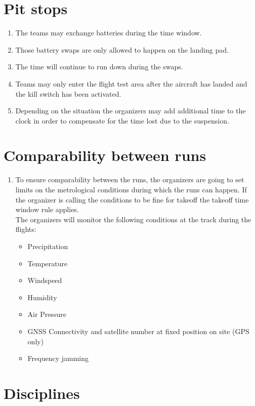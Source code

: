     \section{Pit stops}
    \begin{enumerate}
      \item The teams may exchange batteries during the time window. 
      \item Those battery swaps are only allowed to happen on the landing pad. 
      \item The time will continue to run down during the swaps. 
      \item Teams may only enter the flight test area after the aircraft has landed and the kill switch has been activated.  
      \item Depending on the situation the organizers may add additional time to the clock in order to compensate for the time lost due to the suspension. 
    \end{enumerate}

    \section{Comparability between runs}
    \begin{enumerate}
      \item To ensure comparability between the runs, the organizers are going to set limits on the metrological conditions during which the runs can happen. If the organizer is calling the conditions to be fine for takeoff the takeoff time window rule applies. \\
      The organizers will monitor the following conditions at the track during the flights:
      \begin{itemize}
        \item Precipitation
        \item Temperature 
        \item Windspeed
        \item Humidity
        \item Air Pressure
        \item GNSS Connectivity and satellite number at fixed position on site (GPS only) 
        \item Frequency jamming
      \end{itemize}

    \end{enumerate}

    \section{Disciplines}
